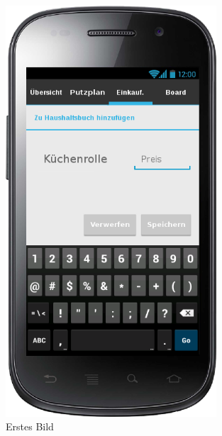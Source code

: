 \begin{figure}[htbp] 
  \centering
     \includegraphics[width=0.7\textwidth]{anhang/mockups/einkaufslisteartikelgekauft.png}
  \caption{Erstes Bild}
  \label{fig:Bild1}
\end{figure}

